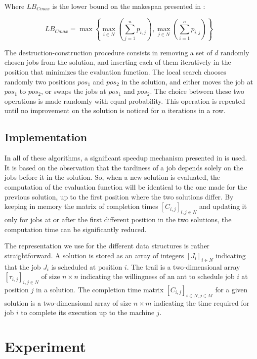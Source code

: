 \documentclass[runningheads]{llncs}
\begin{document}
Where $LB_{Cmax}$ is the lower bound on the makespan presented in
\cite{taillard1993benchmarks}:

\begin{equation}
	LB_{Cmax} = \max\left\{\max_{i\in N}\left(\sum_{j=1}^n p_{i,j}\right), \max_{j\in N}\left(\sum_{i=1}^n p_{i,j}\right)\right\}
\end{equation}

The destruction-construction procedure consists in removing a set of $d$
randomly chosen jobs from the solution, and inserting each of them iteratively
in the position that minimizes the evaluation function. The local search chooses
randomly two positions $pos_1$ and $pos_2$ in the solution, and either moves the
job at $pos_1$ to $pos_2$, or swaps the jobs at $pos_1$ and $pos_2$. The choice
between these two operations is made randomly with equal probability. This
operation is repeated until no improvement on the solution is noticed for $n$
iterations in a row.

\subsection{Implementation}

In all of these algorithms, a significant speedup mechanism presented in
\cite{li2009efficient} is used. It is based on the observation that the
tardiness of a job depends solely on the jobs before it in the solution. So,
when a new solution is evaluated, the computation of the evaluation function
will be identical to the one made for the previous solution, up to the first
position where the two solutions differ. By keeping in memory the matrix of
completion times $[C_{i,j}]_{i,j\in N}$ and updating it only for jobs at or
after the first different position in the two solutions, the computation time
can be significantly reduced.

The representation we use for the different data structures is rather
straightforward. A solution is stored as an array of integers $[J_i]_{i\in N}$
indicating that the job $J_i$ is scheduled at position $i$. The trail is a
two-dimensional array $[\tau_{i,j}]_{i,j\in N}$ of size $n\times n$ indicating
the willingness of an ant to schedule job $i$ at position $j$ in a solution. The
completion time matrix $[C_{i,j}]_{i\in N, j\in M}$ for a given solution is a
two-dimensional array of size $n\times m$ indicating the time required for job
$i$ to complete its execution up to the machine $j$.

\section{Experiment}
\label{sec:exp}
\end{document}
